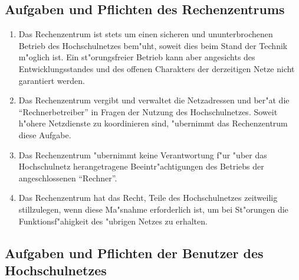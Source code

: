 \subsection{Aufgaben und Pflichten des Rechenzentrums}

\begin{enumerate}
  \item Das Rechenzentrum ist stets um einen sicheren und
    ununterbrochenen Betrieb des Hochschulnetzes bem"uht,
    soweit dies beim Stand der Technik m"oglich ist.
    Ein st"orungsfreier Betrieb kann aber angesichts des
    Entwicklungsstandes und des offenen Charakters der
    derzeitigen Netze nicht garantiert werden.

  \item Das Rechenzentrum vergibt und verwaltet die Netzadressen
    und ber"at die "`Rechnerbetreiber"' in Fragen der Nutzung
    des Hochschulnetzes. Soweit h"ohere Netzdienste zu
    koordinieren sind, "ubernimmt das Rechenzentrum
    diese Aufgabe.

  \item Das Rechenzentrum "ubernimmt keine Verantwortung
    f"ur "uber das Hochschulnetz herangetragene
    Beeintr"achtigungen des Betriebs der angeschlossenen
    "`Rechner"'.

  \item Das Rechenzentrum hat das Recht, Teile des Hochschulnetzes
    zeitweilig stillzulegen, wenn diese Ma"snahme
    erforderlich ist, um bei St"orungen die
    Funktionsf"ahigkeit des "ubrigen Netzes zu erhalten.
\end{enumerate}

\subsection{Aufgaben und Pflichten der Benutzer des Hochschulnetzes}

